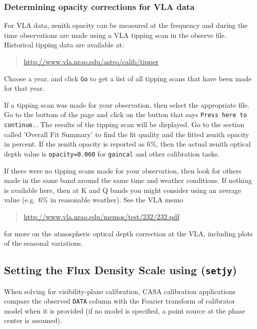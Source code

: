 \subsubsection{Determining opacity corrections for VLA data}
\label{section:cal.prior.opacity.vla}

For VLA data, zenith opacity can be measured at the frequency
and during the time observations are made using a VLA tipping scan in
the observe file.  Historical tipping data are available at:
\begin{quote}
   \url{http://www.vla.nrao.edu/astro/calib/tipper}
\end{quote}
Choose a year, and click {\tt Go} to get a list of all tipping scans
that have been made for that year.

If a tipping scan was made for your observation, then select the
appropriate file.  Go to the bottom of the page and click on the
button that says {\tt Press here to continue.}.  The results of the
tipping scan will be displayed.  Go to the section called 'Overall Fit
Summary' to find the fit quality and the fitted zenith opacity in
percent.  If the zenith opacity is reported as 6\%, then the actual
zenith optical depth value is {\tt opacity=0.060} for {\tt gaincal}
and other calibration tasks.

If there were no tipping scans made for your observation, then look
for others made in the same band around the same time and weather
conditions.  If nothing is available here, then at K and Q bands
you might consider using an average value (e.g.\ 6\% in reasonable
weather).  See the VLA memo
\begin{quote}
   \url{http://www.vla.nrao.edu/memos/test/232/232.pdf}
\end{quote}
for more on the atmospheric optical depth correction at the VLA,
including plots of the seasonal variations.

\subsection{Setting the Flux Density Scale using ({\tt setjy})}
\label{section:cal.prior.models}

When solving for visibility-plane calibration, CASA calibration
applications compare the observed {\tt DATA} column with the Fourier
transform of calibrator model when it is provided (if no model is
specified, a point source at the phase center is assumed).  

